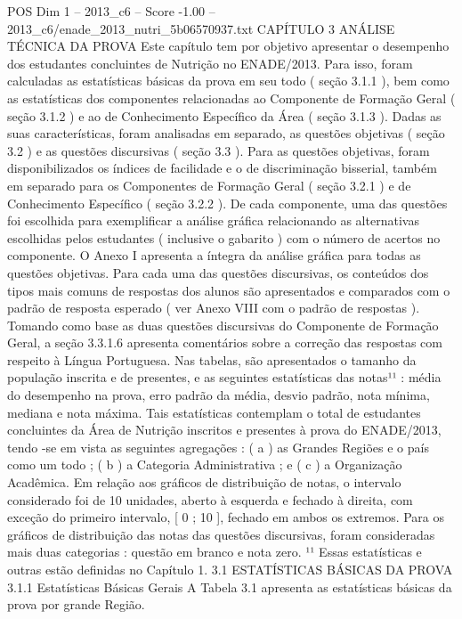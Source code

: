 \begin{textsample}{POS Dim 1 – 2013\_c6 – Score -1.00 – 2013\_c6/enade\_2013\_nutri\_5b06570937.txt}  \label{ex:f1_pos_174}
CAPÍTULO 3 ANÁLISE TÉCNICA DA PROVA Este capítulo tem por objetivo apresentar o desempenho dos estudantes concluintes de Nutrição no ENADE/2013.
Para isso, foram calculadas as estatísticas básicas da prova em seu todo ( seção 3.1.1 ), bem como as estatísticas dos componentes relacionadas ao Componente de Formação Geral ( seção 3.1.2 ) e ao de Conhecimento Específico da Área ( seção 3.1.3 ).
Dadas as suas características, foram analisadas em separado, as questões objetivas ( seção 3.2 ) e as questões discursivas ( seção 3.3 ).
Para as questões objetivas, foram disponibilizados os índices de facilidade e o de discriminação bisserial, também em separado para os Componentes de Formação Geral ( seção 3.2.1 ) e de Conhecimento Específico ( seção 3.2.2 ).
De cada componente, uma das questões foi escolhida para exemplificar a análise gráfica relacionando as alternativas escolhidas pelos estudantes ( inclusive o gabarito ) com o número de acertos no componente.
O Anexo I apresenta a íntegra da análise gráfica para todas as questões objetivas.
Para cada uma das questões discursivas, os conteúdos dos tipos mais comuns de respostas dos alunos são apresentados e comparados com o padrão de resposta esperado ( ver Anexo VIII com o padrão de respostas ).
Tomando como base as duas questões discursivas do Componente de Formação Geral, a seção 3.3.1.6 apresenta comentários sobre a correção das respostas com respeito à Língua Portuguesa.
Nas tabelas, são apresentados o tamanho da população inscrita e de presentes, e as seguintes estatísticas das notas¹¹ : média do desempenho na prova, erro padrão da média, desvio padrão, nota mínima, mediana e nota máxima.
Tais estatísticas contemplam o total de estudantes concluintes da Área de Nutrição inscritos e presentes à prova do ENADE/2013, tendo -se em vista as seguintes agregações : ( a ) as Grandes Regiões e o país como um todo ; ( b ) a Categoria Administrativa ; e ( c ) a Organização Acadêmica.
Em relação aos gráficos de distribuição de notas, o intervalo considerado foi de 10 unidades, aberto à esquerda e fechado à direita, com exceção do primeiro intervalo, [ 0 ; 10 ], fechado em ambos os extremos.
Para os gráficos de distribuição das notas das questões discursivas, foram consideradas mais duas categorias : questão em branco e nota zero. ¹¹ Essas estatísticas e outras estão definidas no Capítulo 1. 3.1 ESTATÍSTICAS BÁSICAS DA PROVA 3.1.1 Estatísticas Básicas Gerais A Tabela 3.1 apresenta as estatísticas básicas da prova por grande Região.

\end{textsample}
